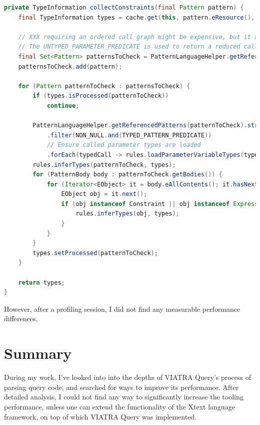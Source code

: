 \documentclass[11pt,a4paper,oneside]{report}
\begin{document}
\begin{lstlisting}[caption={Modified source code of \texttt{collectConstraints}}, language=java]
private TypeInformation collectConstraints(final Pattern pattern) {
    final TypeInformation types = cache.get(this, pattern.eResource(), () -> new TypeInformation(typeSystem));

    // XXX requiring an ordered call graph might be expensive, but it avoids inconsistent errors during type inference
    // The UNTYPED_PARAMETER_PREDICATE is used to return a reduced call graph where pattern with only declared types are (transitively) ignored.
    final Set<Pattern> patternsToCheck = PatternLanguageHelper.getReferencedPatternsTransitive(pattern, true, NON_NULL.and(UNTYPED_PATTERN_PREDICATE));
    patternsToCheck.add(pattern);

    for (Pattern patternToCheck : patternsToCheck) {
        if (types.isProcessed(patternToCheck))
            continue;

        PatternLanguageHelper.getReferencedPatterns(patternToCheck).stream()
            .filter(NON_NULL.and(TYPED_PATTERN_PREDICATE))
            // Ensure called parameter types are loaded
            .forEach(typedCall -> rules.loadParameterVariableTypes(typedCall, types));
        rules.inferTypes(patternToCheck, types);
        for (PatternBody body : patternToCheck.getBodies()) {
            for (Iterator<EObject> it = body.eAllContents(); it.hasNext();) {
                EObject obj = it.next();
                if (obj instanceof Constraint || obj instanceof Expression) {
                    rules.inferTypes(obj, types);
                }
            }
        }
        types.setProcessed(patternToCheck);
    }

    return types;
}
\end{lstlisting}

However, after a profiling session, I did not find any measurable performance
differences.

\chapter{Summary}

During my work, I've looked into into the depths of VIATRA Query's process of
parsing query code, and searched for ways to improve its performance. After
detailed analysis, I could not find any way to significantly increase the
tooling performance, unless one can extend the functionality of the Xtext
language framework, on top of which VIATRA Query was implemented.
\end{document}
